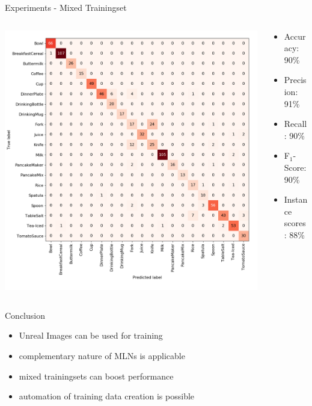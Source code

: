 \documentclass[]{beamer}
\begin{document}
\begin{frame}{Experiments - Mixed Trainingset}
\begin{columns}
	\begin{column}{0.7\textwidth}
		\includegraphics[scale=.3]{../thesis/img/chapter6/UnrealRealMixedGTClass.png}
	\end{column}
	\quad
	\begin{column}{0.3\textwidth}
		\begin{itemize}
			\item Accuracy: 90\%
			\item Precision: 91\%
			\item Recall: 90\%
			\item F$_{1}$-Score: 90\%
			\bigskip
			\item Instance scores: 88\%
		\end{itemize}
	\end{column}
\end{columns}
\end{frame}

\begin{frame}{Conclusion}
	\begin{itemize}
		\item Unreal Images can be used for training
		\item complementary nature of MLNs is applicable 
		\item mixed trainingsets can boost performance
		\bigskip
		\item automation of training data creation is possible
	\end{itemize}
\end{frame}
\end{document}

